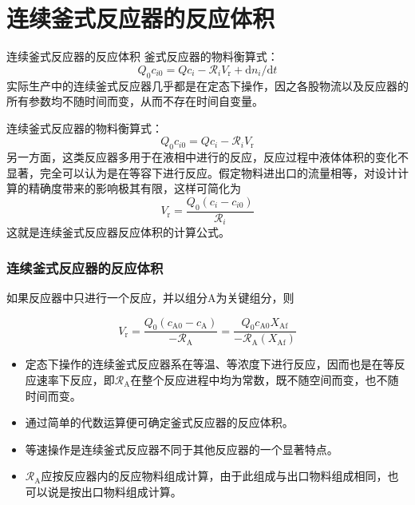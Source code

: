 \documentclass[dvipsnames, svgnames, x11names]{beamer}
\begin{document}
\section{连续釜式反应器的反应体积}


\begin{frame}{连续釜式反应器的反应体积}
    釜式反应器的物料衡算式：
    \[
        Q_0c_{i0}=Qc_{i}-\mathcal{R}_iV_\mathrm{r}+\mathrm{d}n_i/\mathrm{d}t
    \]
    实际生产中的连续釜式反应器几乎都是在定态下操作，因之各股物流以及反应器的所有参数均不随时间而变，从而不存在时间自变量。

    连续釜式反应器的物料衡算式：
    \[
        Q_0c_{i0}=Qc_{i}-\mathcal{R}_iV_\mathrm{r}
    \]
    另一方面，这类反应器多用于在液相中进行的反应，反应过程中液体体积的变化不显著，完全可以认为是在等容下进行反应。假定物料进出口的流量相等，对设计计算的精确度带来的影响极其有限，这样可简化为
    \[
        V_{\mathrm{r}}=\frac{Q_{0}\left(c_{i}-c_{i 0}\right)}{\mathcal{R}_i}
    \]
    这就是连续釜式反应器反应体积的计算公式。
\end{frame}


\begin{frame}
    \frametitle{连续釜式反应器的反应体积}

    如果反应器中只进行一个反应，并以组分A为关键组分，则

    \[
        V_{\mathrm{r}}=\frac{Q_{0}(c_{\mathrm{A} 0}-c_{\mathrm{A}})}{-\mathscr{R}_{\mathrm{A}}}=\frac{Q_{0} c_{\mathrm{A} 0} X_{\mathrm{Af}}}{-\mathscr{R}_{\mathrm{A}}(X_{\mathrm{Af}})}
    \]

    \begin{itemize}
        \item[\bullet]定态下操作的连续釜式反应器系在等温、等浓度下进行反应，因而也是在等反应速率下反应，即$\mathscr{R}_{\mathrm{A}}$在整个反应进程中均为常数，既不随空间而变，也不随时间而变。
        \item[\bullet] 通过简单的代数运算便可确定釜式反应器的反应体积。
        \item[\bullet] 等速操作是连续釜式反应器不同于其他反应器的一个显著特点。
        \item[\bullet] $\mathscr{R}_{\mathrm{A}}$应按反应器内的反应物料组成计算，由于此组成与出口物料组成相同，也可以说是按出口物料组成计算。
    \end{itemize}

\end{frame}
\end{document}
